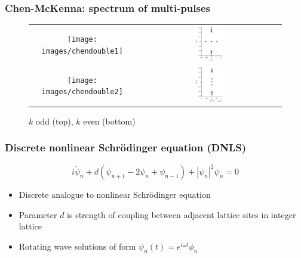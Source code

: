 \documentclass[16pt]{beamer}
\begin{document}
\begin{frame}
\frametitle{Chen-McKenna: spectrum of multi-pulses}
	\fontsize{16}{7.2}\selectfont
\begin{figure}[H]
\begin{center}
\begin{tabular}{cc}
\texttt{[image: images/chendouble1]} & \includegraphics[width=0.2\textwidth]{images/chenspecdouble1} \\
\texttt{[image: images/chendouble2]} & \includegraphics[width=0.2\textwidth]{images/chenspecdouble2} \\
\end{tabular}
\end{center}
$k$ odd (top), $k$ even (bottom)
\end{figure}
\end{frame}

\begin{frame}
\frametitle{Discrete nonlinear Schr{\"o}dinger equation (DNLS)}
\fontsize{16}{7.2}\selectfont
\begin{equation*}
i\dot{\psi}_n + d(\psi_{n+1} - 2 \psi_n + \psi_{n-1}) + |\psi_n|^2 \psi_n = 0
\end{equation*}
\begin{itemize}
	\item Discrete analogue to nonlinear Schr{\"o}dinger equation 
	\item Parameter $d$ is strength of coupling between adjacent lattice sites in integer lattice
	\item Rotating wave solutions of form $\psi_n(t) = e^{i \omega t}\phi_n$
\end{itemize}
\end{frame}
\end{document}
